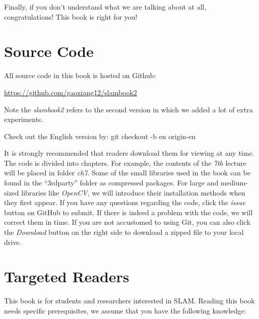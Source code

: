 Finally, if you don't understand what we are talking about at all, congratulations! This book is right for you!

\section*{Source Code}

All source code in this book is hosted on Github:

{\hfill\url{https://github.com/gaoxiang12/slambook2}\hfill}

Note the \textit{slambook2} refers to the second version in which we added a lot of extra experiments.

Check out the English version by:
{\hfill git checkout -b en origin-en\hfill}

It is strongly recommended that readers download them for viewing at any time. The code is divided into chapters. For example, the contents of the \textit{7th} lecture will be placed in folder \textit{ch7}. Some of the small libraries used in the book can be found in the ``3rdparty'' folder as compressed packages. For large and medium-sized libraries like \textit{OpenCV}, we will introduce their installation methods when they first appear. If you have any questions regarding the code, click the \textit{issue} button on GitHub to submit. If there is indeed a problem with the code, we will correct them in time. If you are not accustomed to using Git, you can also click the  \textit{Download} button on the right side to download a zipped file to your local drive.

\section*{Targeted Readers}

This book is for students and researchers interested in SLAM. Reading this book needs specific prerequisites, we assume that you have the following knowledge:

